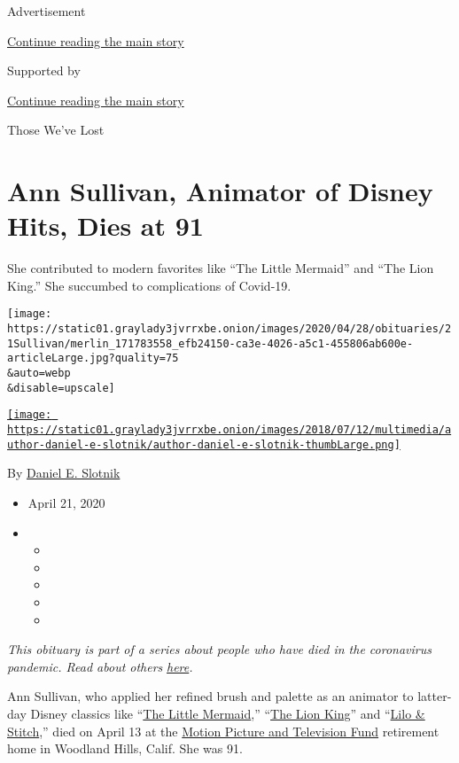 Advertisement

\protect\hyperlink{after-top}{Continue reading the main story}

Supported by

\protect\hyperlink{after-sponsor}{Continue reading the main story}

Those We've Lost

\hypertarget{ann-sullivan-animator-of-disney-hits-dies-at-91}{%
\section{Ann Sullivan, Animator of Disney Hits, Dies at
91}\label{ann-sullivan-animator-of-disney-hits-dies-at-91}}

She contributed to modern favorites like ``The Little Mermaid'' and
``The Lion King.'' She succumbed to complications of Covid-19.

\texttt{[image: https://static01.graylady3jvrrxbe.onion/images/2020/04/28/obituaries/21Sullivan/merlin\_171783558\_efb24150-ca3e-4026-a5c1-455806ab600e-articleLarge.jpg?quality=75\\\&auto=webp\\\&disable=upscale]}

\href{https://www.nytimes3xbfgragh.onion/by/daniel-e-slotnik}{\texttt{[image: https://static01.graylady3jvrrxbe.onion/images/2018/07/12/multimedia/author-daniel-e-slotnik/author-daniel-e-slotnik-thumbLarge.png]}}

By \href{https://www.nytimes3xbfgragh.onion/by/daniel-e-slotnik}{Daniel
E. Slotnik}

\begin{itemize}
\item
  April 21, 2020
\item
  \begin{itemize}
  \item
  \item
  \item
  \item
  \item
  \end{itemize}
\end{itemize}

\emph{This obituary is part of a series about people who have died in
the coronavirus pandemic. Read about others}
\href{https://www.nytimes3xbfgragh.onion/series/people-who-have-died-of-the-coronavirus}{\emph{here}}\emph{.}

Ann Sullivan, who applied her refined brush and palette as an animator
to latter-day Disney classics like
``\href{https://www.nytimes3xbfgragh.onion/1989/11/15/movies/review-film-andersen-s-mermaid-by-way-of-disney.html}{The
Little Mermaid},''
``\href{https://www.nytimes3xbfgragh.onion/1994/06/15/movies/review-film-the-hero-within-the-child-within.html}{The
Lion King}'' and
``\href{https://www.nytimes3xbfgragh.onion/2002/06/21/movies/film-review-escaping-deep-space-exile-and-making-friends-in-hawaii.html}{Lilo
\& Stitch},'' died on April 13 at the \href{https://mptf.com/}{Motion
Picture and Television Fund} retirement home in Woodland Hills, Calif.
She was 91.

